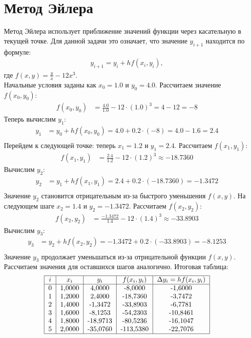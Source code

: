 \documentclass[a4paper,12pt]{article}
\begin{document}
\section*{Метод Эйлера}
Метод Эйлера использует приближение значений функции через касательную в текущей точке. Для данной задачи это означает, что значение $y_{i+1}$ находится по формуле:
\begin{align*}
    y_{i+1} = y_i + h f(x_i, y_i),
\end{align*}
где $f(x, y) = \frac{y}{x} - 12x^3$.\\
Начальные условия заданы как $x_0 = 1.0$ и $y_0 = 4.0$. Рассчитаем значение $f(x_0, y_0)$:
\begin{align*}
    f(x_0, y_0) &= \frac{4.0}{1.0} - 12 \cdot (1.0)^3 = 4 - 12 = -8
\end{align*}
Теперь вычислим $y_1$:
\begin{align*}
    y_1 &= y_0 + h f(x_0, y_0) = 4.0 + 0.2 \cdot (-8) = 4.0 - 1.6 = 2.4\\
\end{align*}
Перейдем к следующей точке: теперь $x_1 = 1.2$ и $y_1 = 2.4$. Рассчитаем $f(x_1, y_1)$:
\begin{align*}
    f(x_1, y_1) &= \frac{2.4}{1.2} - 12 \cdot (1.2)^3 \approx -18.7360
\end{align*}
Вычислим $y_2$:
\begin{align*}
    y_2 &= y_1 + h f(x_1, y_1) = 2.4 + 0.2 \cdot (-18.7360) = -1.3472\\
\end{align*}
Значение $y_2$ становится отрицательным из-за быстрого уменьшения $f(x, y)$.
На следующем шаге $x_2 = 1.4$ и $y_2 = -1.3472$. Рассчитаем $f(x_2, y_2)$:
\begin{align*}
    f(x_2, y_2) &= \frac{-1.3472}{1.4} - 12 \cdot (1.4)^3 \approx -33.8903
\end{align*}
Вычислим $y_3$:
\begin{align*}
    y_3 &= y_2 + h f(x_2, y_2) = -1.3472 + 0.2 \cdot (-33.8903) = -8.1253\\
\end{align*}
Значение $y_3$ продолжает уменьшаться из-за отрицательной функции $f(x, y)$.
Рассчитаем значения для оставшихся шагов аналогично. Итоговая таблица:
\begin{align*}
    \begin{tabular}{|c|c|c|c|c|}
        \hline
        $i$ & $x_i$ & $y_i$ & $f(x_i, y_i)$ & $\Delta y_i = h f(x_i, y_i)$ \\
        \hline
        0 & 1,0000 & 4,0000   & -8,0000   & -1,6000  \\
        1 & 1,2000 & 2,4000   & -18,7360  & -3,7472  \\
        2 & 1,4000 & -1,3472  & -33,8903  & -6,7781  \\
        3 & 1,6000 & -8,1253  & -54,2303  & -10,8461 \\
        4 & 1,8000 & -18,9713 & -80,5236  & -16,1047 \\
        5 & 2,0000 & -35,0760 & -113,5380 & -22,7076 \\
        \hline
    \end{tabular}
\end{align*}
\end{document}
